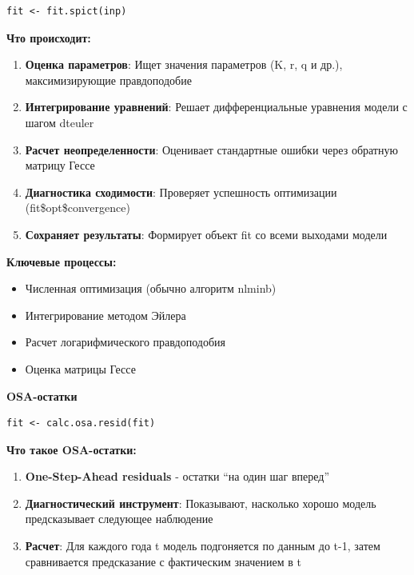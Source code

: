 \documentclass[
  letterpaper,
  DIV=11,
  numbers=noendperiod]{scrreprt}
\begin{document}
\begin{verbatim}
fit <- fit.spict(inp)
\end{verbatim}

\textbf{Что происходит:}

\begin{enumerate}
\def\labelenumi{\arabic{enumi}.}
\item
  \textbf{Оценка параметров}: Ищет значения параметров (K, r, q и др.),
  максимизирующие правдоподобие
\item
  \textbf{Интегрирование уравнений}: Решает дифференциальные уравнения
  модели с шагом dteuler
\item
  \textbf{Расчет неопределенности}: Оценивает стандартные ошибки через
  обратную матрицу Гессе
\item
  \textbf{Диагностика сходимости}: Проверяет успешность оптимизации
  (fit\$opt\$convergence)
\item
  \textbf{Сохраняет результаты}: Формирует объект fit со всеми выходами
  модели
\end{enumerate}

\textbf{Ключевые процессы:}

\begin{itemize}
\item
  Численная оптимизация (обычно алгоритм nlminb)
\item
  Интегрирование методом Эйлера
\item
  Расчет логарифмического правдоподобия
\item
  Оценка матрицы Гессе
\end{itemize}

\textbf{OSA-остатки}

\begin{verbatim}
fit <- calc.osa.resid(fit)
\end{verbatim}

\textbf{Что такое OSA-остатки:}

\begin{enumerate}
\def\labelenumi{\arabic{enumi}.}
\item
  \textbf{One-Step-Ahead residuals} - остатки ``на один шаг вперед''
\item
  \textbf{Диагностический инструмент}: Показывают, насколько хорошо
  модель предсказывает следующее наблюдение
\item
  \textbf{Расчет}: Для каждого года t модель подгоняется по данным до
  t-1, затем сравнивается предсказание с фактическим значением в t
\end{enumerate}
\end{document}
